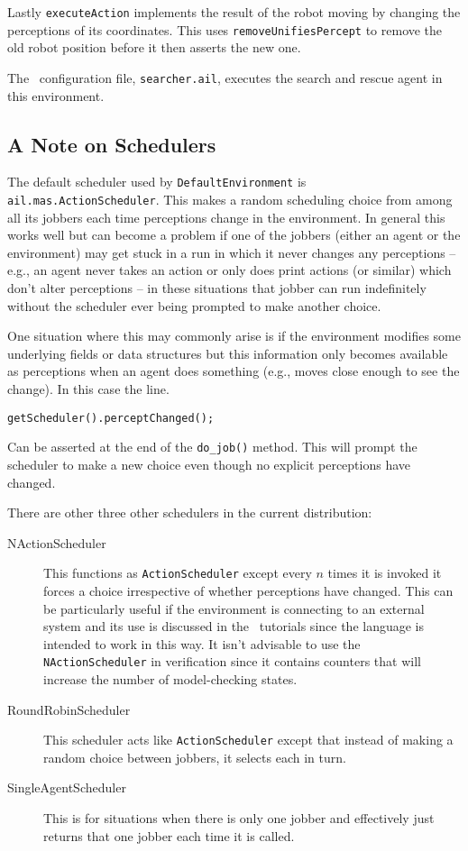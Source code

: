 \documentclass[a4]{article}
\begin{document}
Lastly \texttt{executeAction} implements the result of the robot moving by changing the perceptions of its coordinates.  This uses \texttt{removeUnifiesPercept} to remove the old robot position before it then asserts the new one.

The \ail\ configuration file, \texttt{searcher.ail}, executes the search and rescue agent in this environment.

\subsection{A Note on Schedulers}

\begin{sloppypar}
The default scheduler used by \texttt{DefaultEnvironment} is \texttt{ail.mas.ActionScheduler}.  This makes a random scheduling choice from among all its jobbers each time perceptions change in the environment.  In general this works well but can become a problem if one of the jobbers (either an agent or the environment) may get stuck in a run in which it never changes any perceptions -- e.g., an agent never takes an action or only does print actions (or similar) which don't alter perceptions -- in these situations that jobber can run indefinitely without the scheduler ever being prompted to make another choice.
\end{sloppypar}

One situation where this may commonly arise is if the environment modifies some underlying fields or data structures but this information only becomes available as perceptions when an agent does something (e.g., moves close enough to see the change).  In this case the line.
\begin{verbatim}
getScheduler().perceptChanged();
\end{verbatim}
Can be asserted at the end of the \texttt{do\_job()} method.  This will prompt the scheduler to make a new choice even though no explicit perceptions have changed.

There are other three other schedulers in the current distribution:

\begin{description}
\item[NActionScheduler] This functions as \texttt{ActionScheduler} except every $n$ times it is invoked it forces a choice irrespective of whether perceptions have changed.  This can be particularly useful if the environment is connecting to an external system and its use is discussed in the \eass\ tutorials since the language is intended to work in this way.  It isn't advisable to use the \texttt{NActionScheduler} in verification since it contains counters that will increase the number of model-checking states.
\item[RoundRobinScheduler]  This scheduler acts like \texttt{ActionScheduler} except that instead of making a random choice between jobbers, it selects each in turn.
\item[SingleAgentScheduler] This is for situations when there is only one jobber and effectively just returns that one jobber each time it is called.
\end{description}
\end{document}
